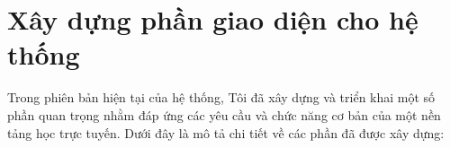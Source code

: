 \documentclass[../Thesis.tex]{subfiles}
\begin{document}




\section{Xây dựng phần giao diện cho hệ thống}
\label{subsec:xay-dung-giao-dien}

    Trong phiên bản hiện tại của hệ thống, Tôi đã xây dựng và triển khai một số phần quan trọng nhằm đáp ứng các yêu cầu và chức năng cơ bản của một nền tảng học trực tuyến. Dưới đây là mô tả chi tiết về các phần đã được xây dựng:
\end{document}
